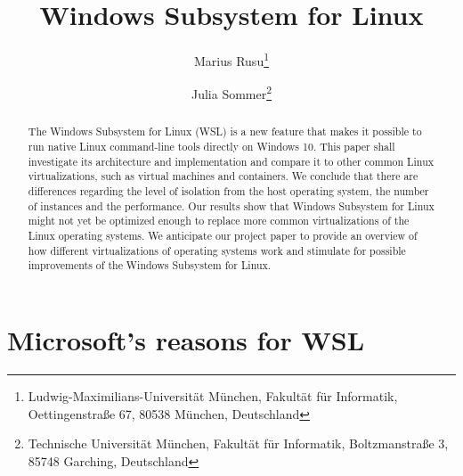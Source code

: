 \documentclass[utf8,biblatex, ngerman, english]{lni}
\begin{document}
\title[WSL]{Windows Subsystem for Linux}
\author[Marius Rusu \and Julia Sommer]
{Marius Rusu\footnote{Ludwig-Maximilians-Universität München, Fakultät für Informatik, Oettingenstraße 67, 80538 München, Deutschland } \and
 Julia Sommer\footnote{Technische Universität München, Fakultät für Informatik, Boltzmanstraße 3, 85748 Garching, Deutschland }}
\maketitle
\newpage
\newpage

\begin{abstract}
The Windows Subsystem for Linux (WSL) is a new feature that makes it possible to run native Linux command-line tools directly on Windows 10. This paper shall investigate its architecture and implementation and compare it to other common Linux virtualizations, such as virtual machines and containers. We conclude that there are differences regarding the level of isolation from the host operating system, the number of instances and the performance. Our results show that Windows Subsystem for Linux might not yet be optimized enough to replace more common virtualizations of the Linux operating systems. We anticipate our project paper to provide an overview of how different virtualizations of operating systems work and stimulate for possible improvements of the Windows Subsystem for Linux. 
\end{abstract}


\section{Microsoft's reasons for WSL}
\end{document}

